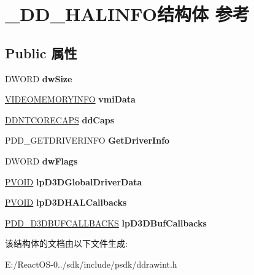 \hypertarget{struct___d_d___h_a_l_i_n_f_o}{}\section{\+\_\+\+D\+D\+\_\+\+H\+A\+L\+I\+N\+F\+O结构体 参考}
\label{struct___d_d___h_a_l_i_n_f_o}
\subsection*{Public 属性}
\begin{DoxyCompactItemize}
\item 
\mbox{\label{struct___d_d___h_a_l_i_n_f_o_a07f4fe1a0b8a0fbf64c8238adc4abe81}} 
D\+W\+O\+RD {\bfseries dw\+Size}
\item 
\mbox{\label{struct___d_d___h_a_l_i_n_f_o_add098db90a7dd69e3b62ccf4b984e7d3}} 
\hyperlink{struct___v_i_d_e_o_m_e_m_o_r_y_i_n_f_o}{V\+I\+D\+E\+O\+M\+E\+M\+O\+R\+Y\+I\+N\+FO} {\bfseries vmi\+Data}
\item 
\mbox{\label{struct___d_d___h_a_l_i_n_f_o_ad1228af17157678a2b48d20028e7fcc4}} 
\hyperlink{struct___d_d_n_t_c_o_r_e_c_a_p_s}{D\+D\+N\+T\+C\+O\+R\+E\+C\+A\+PS} {\bfseries dd\+Caps}
\item 
\mbox{\label{struct___d_d___h_a_l_i_n_f_o_ab2eec029da1845cbb44bea3608997e71}} 
P\+D\+D\+\_\+\+G\+E\+T\+D\+R\+I\+V\+E\+R\+I\+N\+FO {\bfseries Get\+Driver\+Info}
\item 
\mbox{\label{struct___d_d___h_a_l_i_n_f_o_aa95e61e5995320c30801c2d60b5df0d2}} 
D\+W\+O\+RD {\bfseries dw\+Flags}
\item 
\mbox{\label{struct___d_d___h_a_l_i_n_f_o_a9ea2f55635fc427d3295d008d99c6b0f}} 
\hyperlink{interfacevoid}{P\+V\+O\+ID} {\bfseries lp\+D3\+D\+Global\+Driver\+Data}
\item 
\mbox{\label{struct___d_d___h_a_l_i_n_f_o_a7f07254253dc04e429145a36aba2c515}} 
\hyperlink{interfacevoid}{P\+V\+O\+ID} {\bfseries lp\+D3\+D\+H\+A\+L\+Callbacks}
\item 
\mbox{\label{struct___d_d___h_a_l_i_n_f_o_a80c622d3e70f081d99d4fd92490fcc95}} 
\hyperlink{struct___d_d___d3_d_b_u_f_c_a_l_l_b_a_c_k_s}{P\+D\+D\+\_\+\+D3\+D\+B\+U\+F\+C\+A\+L\+L\+B\+A\+C\+KS} {\bfseries lp\+D3\+D\+Buf\+Callbacks}
\end{DoxyCompactItemize}


该结构体的文档由以下文件生成\+:\begin{DoxyCompactItemize}
\item 
E\+:/\+React\+O\+S-\/0../sdk/include/psdk/ddrawint.\+h\end{DoxyCompactItemize}

